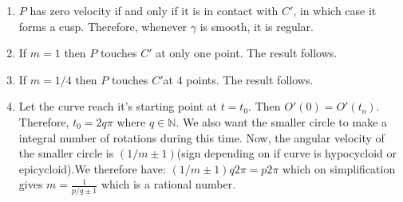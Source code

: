 \documentclass[oneside]{book}\twocolumn
\begin{document}
\begin{enumerate}
\begin{center}
\begin{tikzpicture}[x=0.75pt,y=0.75pt,yscale=-1,xscale=1]
\end{tikzpicture}

    \end{center}
    \item $P$ has zero velocity if and only if it is in contact with $C'$, in which case it forms a cusp. Therefore, whenever $\gamma$ is smooth, it is regular.
    \item If $m=1$ then $P$ touches $C'$ at only one point. The result follows.
    \item If $m=1/4$ then $P$ touches $C'$at $4$ points. The result follows.
    \item Let the curve reach it's starting point at $t=t_0$. Then $O'(0)=O'(t_o)$. Therefore, $t_0=2q\pi$ where $q\in\mathbb N$. We also want the smaller circle to make a integral number of rotations during this time. Now, the angular velocity of the smaller circle is $(1/m\pm 1)$(sign depending on if curve is hypocycloid or epicycloid).We therefore have: $(1/m\pm 1)q2\pi=p2\pi$ which on simplification gives
    $m=\frac{1}{p/q\pm 1}$ which is a rational number.
\end{enumerate}
\end{document}
